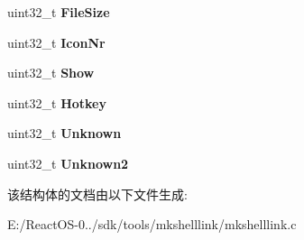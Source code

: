 \begin{DoxyCompactItemize}
uint32\+\_\+t {\bfseries File\+Size}
\item 
\mbox{\label{struct___l_n_k___h_e_a_d_e_r_a476513b79bde2e6d781c1a2d2f94909f}} 
uint32\+\_\+t {\bfseries Icon\+Nr}
\item 
\mbox{\label{struct___l_n_k___h_e_a_d_e_r_a9d571984b7f48f6e9fecfbb9af7467de}} 
uint32\+\_\+t {\bfseries Show}
\item 
\mbox{\label{struct___l_n_k___h_e_a_d_e_r_a7e3c16422d8a0af7e9827ae37606e213}} 
uint32\+\_\+t {\bfseries Hotkey}
\item 
\mbox{\label{struct___l_n_k___h_e_a_d_e_r_ae9d420dd5904217b3b782920f6c7ac78}} 
uint32\+\_\+t {\bfseries Unknown}
\item 
\mbox{\label{struct___l_n_k___h_e_a_d_e_r_a746e878d7f4751de1102edc13de9191b}} 
uint32\+\_\+t {\bfseries Unknown2}
\end{DoxyCompactItemize}


该结构体的文档由以下文件生成\+:\begin{DoxyCompactItemize}
\item 
E\+:/\+React\+O\+S-\/0../sdk/tools/mkshelllink/mkshelllink.\+c\end{DoxyCompactItemize}
